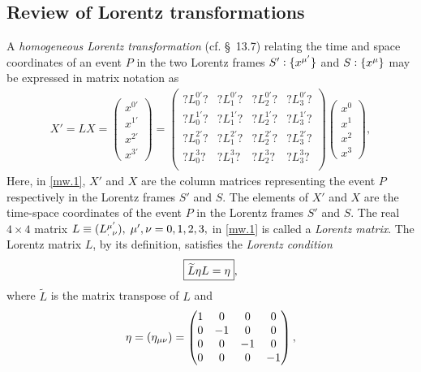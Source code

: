 \subsection{Review of Lorentz transformations} 
A \textsl{homogeneous Lorentz transformation} (cf. 
\S~13.7)  relating the time and space coordinates of an 
event $P$ in the two Lorentz frames $S':\{x^{{\mu'}}\}$ 
and $S:\{x^{{\mu}}\}$ may be expressed in matrix notation 
as
\begin{align}\label{mw.1}
X'=LX= \begin{pmatrix}
x^{0'}\\x^{1'}\\x^{2'}\\x^{3'}\end{pmatrix}
=\begin{pmatrix}
 ?L^{0'}_0?&  ?L^{0'}_1?&  ?L^{0'}_2? &?L^{0'}_3?\\
 ?L^{1'}_0?&  ?L^{1'}_1?&  ?L^{1'}_2? &?L^{1'}_3?\\
 ?L^{2'}_0?&  ?L^{2'}_1?&  ?L^{2'}_2? &?L^{2'}_3?\\
 ?L^{3}_0? &  ?L^{3}_1? &  ?L^{3}_2?  &?L^{3}_3?\\
\end{pmatrix}
\begin{pmatrix}
x^{0}\\x^{1}\\x^{2}\\x^{3}
\end{pmatrix} ,
\end{align}
Here, in \eqref{mw.1}, $X'$ and $X$ are the column 
matrices representing the event $P$ respectively in the 
Lorentz frames $S'$ and $S$. The elements of  $X'$ and 
$X$ are the time-space coordinates of  the event $P$ in 
the Lorentz frames $S'$ and $S$. The real $4\times 4$ 
matrix $L\equiv ({{L}^{{\mu'}}_{.\;{\nu}}}), 
\;{\mu'},{\nu}=0,1,2,3,$ in \eqref{mw.1} is called a 
\textsl{Lorentz matrix}.  The Lorentz matrix $L$, by 
its definition, satisfies the \textsl{Lorentz 
condition}
\begin{align}\label{mw.2}
\boxed{\widetilde{L}{\eta} L ={\eta}},
\end{align}
where $\tilde{L}$ is the matrix transpose of $L$
and 
\begin{align}\label{mw.3}
{\eta}=({\eta}_{{\mu}{\nu}})=
\begin{pmatrix}
1&0&0&0\\0&-1&0&0\\0&0&-1&0\\0&0&0&-1
\end{pmatrix} ,
\end{align}
